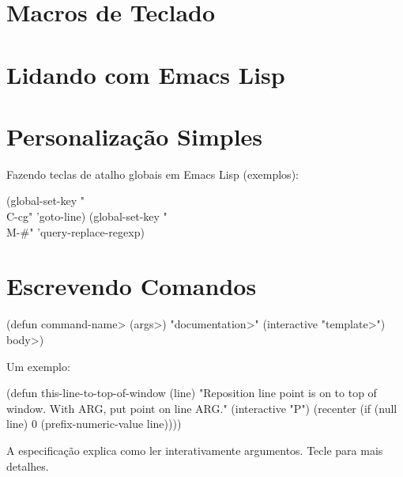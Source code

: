 \section{Macros de Teclado}


\section{Lidando com Emacs Lisp}


\section{Personaliza{\c{c}}{\~a}o Simples}



Fazendo teclas de atalho globais em Emacs Lisp (exemplos):

\beginexample%
(global-set-key "\\C-cg" 'goto-line)
(global-set-key "\\M-\#" 'query-replace-regexp)
\endexample

\section{Escrevendo Comandos}

\beginexample%
(defun \<command-name> (\<args>)
  "\<documentation>" (interactive "\<template>")
  \<body>)
\endexample

Um exemplo:

\beginexample%
(defun this-line-to-top-of-window (line)
  "Reposition line point is on to top of window.
With ARG, put point on line ARG."
  (interactive "P")
  (recenter (if (null line)
                0
              (prefix-numeric-value line))))
\endexample

A especifica{\c{c}}{\~a}o  explica como ler
interativamente argumentos.  Tecle  para mais
detalhes.

\copyrightnotice

\bye



